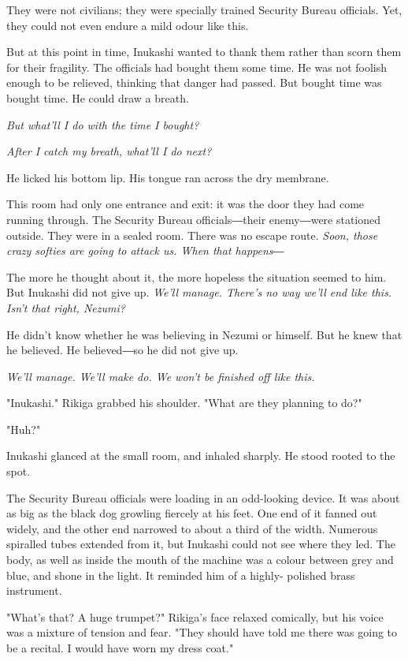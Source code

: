 They were not civilians; they were specially trained Security Bureau
officials. Yet, they could not even endure a mild odour like this.

But at this point in time, Inukashi wanted to thank them rather than
scorn them for their fragility. The officials had bought them some time.
He was not foolish enough to be relieved, thinking that danger had
passed. But bought time was bought time. He could draw a breath.

\emph{But what'll I do with the time I bought?}

\emph{After I catch my breath, what'll I do next?}

He licked his bottom lip. His tongue ran across the dry membrane.

This room had only one entrance and exit: it was the door they had come
running through. The Security Bureau officials―their enemy―were
stationed outside. They were in a sealed room. There was no escape
route. \emph{Soon, those crazy softies are going to attack us. When that
	happens―}

The more he thought about it, the more hopeless the situation seemed to
him. But Inukashi did not give up. \emph{We'll manage. There's no way we'll
	end like this. Isn't that right, Nezumi?}

He didn't know whether he was believing in Nezumi or himself. But he
knew that he believed. He believed―so he did not give up.

\emph{We'll manage. We'll make do. We won't be finished off like this.}

"Inukashi." Rikiga grabbed his shoulder. "What are they planning to do?"

"Huh?"

Inukashi glanced at the small room, and inhaled sharply. He stood rooted
to the spot.

The Security Bureau officials were loading in an odd-looking device. It
was about as big as the black dog growling fiercely at his feet. One end
of it fanned out widely, and the other end narrowed to about a third of
the width. Numerous spiralled tubes extended from it, but Inukashi could
not see where they led. The body, as well as inside the mouth of the
machine was a colour between grey and blue, and shone in the light. It
reminded him of a highly- polished brass instrument.

"What's that? A huge trumpet?" Rikiga's face relaxed comically, but his
voice was a mixture of tension and fear. "They should have told me there
was going to be a recital. I would have worn my dress coat."

